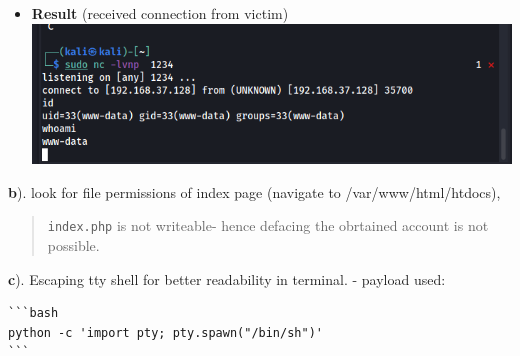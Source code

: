 \begin{itemize}
\tightlist
\item
  \textbf{Result} (received connection from victim)
  \includegraphics{images/task2/reverse_shell.PNG}
\end{itemize}

\textbf{b}). look for file permissions of index page (navigate to
/var/www/html/htdocs),

\begin{Shaded}
\begin{Highlighting}[]
    \ExtensionTok{$}
     
\end{Highlighting}
\end{Shaded}

\begin{quote}
\texttt{index.php} is not writeable- hence defacing the obrtained
account is not possible.
\end{quote}

\textbf{c}). Escaping tty shell for better readability in terminal. -
payload used:

\begin{verbatim}
```bash
python -c 'import pty; pty.spawn("/bin/sh")'
```
\end{verbatim}

